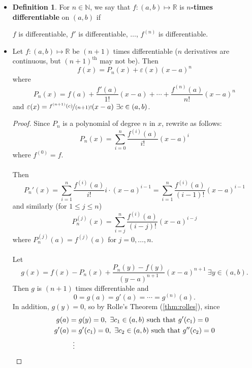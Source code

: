 \documentclass{article}
\newcommand{\R}{\mathbb{R}}
\newcommand{\N}{\mathbb{N}}
\newcommand{\?}{\stackrel{?}{=}}
\theoremstyle{definition} %
\newtheorem{definition}[theorem]{Definition} %
\begin{document}
\begin{itemize}
    \item[]
    \begin{definition}
        For $n \in \N$, we say that $f: (a, b) \mapsto \R$ is \textbf{$n$-times differentiable} on $(a, b)$ if
        \begin{center}
            $f$ is differentiable, $f'$ is differentiable, $\ldots$, $f^{(n)}$ is differentiable.
        \end{center}
    \end{definition}
    \item[]
    \begin{theorem}[Taylor]
        Let $f: (a, b) \mapsto \R$ be $(n + 1)$ times differentiable ($n$ derivatives are continuous, but $(n + 1)^{\text{th}}$ may not be). Then
        $$f(x) = P_n(x) + \varepsilon(x)(x - a)^n$$
        where
        $$P_n(x) = f(a) + \frac{f'(a)}{1!}(x - a) + \cdots + \frac{f^{(n)}(a)}{n!}(x - a)^n$$
        and $\varepsilon(x) = \nicefrac{f^{(n + 1)}(c)}{(n + 1)!}(x - a) \ \exists c \in (a, b)$.
        \label{thm:taylor_expansion}
    \end{theorem}
    \begin{proof}
        Since $P_n$ is a polynomial of degree $n$ in $x$, rewrite as follows:
        $$P_n(x) = \sum_{i = 0}^{n} \frac{f^{(i)}(a)}{i!}(x - a)^i$$
        where $f^{(0)} = f$. \\\\
        Then
        $$P_n'(x) = \sum_{i = 1}^{n} \frac{f^{(i)}(a)}{i!}i \cdot (x - a)^{i - 1} = \sum_{i = 1}^{n} \frac{f^{(i)}(a)}{(i - 1)!}(x - a)^{i - 1}$$
        and similarly (for $1 \leq j \leq n$)
        $$P_n^{(j)}(x) = \sum_{i = j}^{n} \frac{f^{(i)}(a)}{(i - j)!}(x - a)^{i - j}$$
        where $P_n^{(j)}(a) = f^{(j)}(a)$ for $j = 0, \ldots, n$. \\\\
        Let
        $$g(x) = f(x) - P_n(x) + \frac{P_n(y) - f(y)}{(y - a)^{n + 1}}(x - a)^{n + 1} \ \exists y \in (a, b).$$
        Then $g$ is $(n + 1)$ times differentiable and
        $$0 = g(a) = g'(a) = \cdots = g^{(n)}(a).$$
        In addition, $g(y) = 0$, so by Rolle's Theorem (\ref{thm:rolles}), since
        \begin{align*}
            g(a) &= g(y) = 0, \ \exists c_1 \in (a, b) \text{ such that } g'(c_1) = 0 \\
            g'(a) &= g'(c_1) = 0, \ \exists c_2 \in (a, b) \text{ such that } g''(c_2) = 0 \\
            &\vdotswithin{=} \\

\end{align*}
\end{proof}
\end{itemize}
\end{document}
